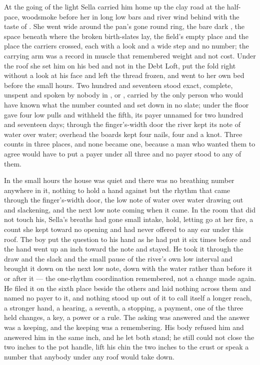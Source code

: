 \scenebreak

At the going of the light Sella carried him home up the clay road at the half-pace, woodsmoke before her in long low bars and river wind behind with the taste of . She went wide around the pan's gone round ring, the bare dark , the space beneath  where the broken birth-slates lay, the field's empty place and the place the carriers crossed, each with a look and a wide step and no number; the carrying arm was a record in muscle that remembered weight and not cost. Under the roof she set him on his bed and not in the Debt Loft, put the fold right without a look at his face and left the thread frozen, and went to her own bed before the small hours. Two hundred and seventeen stood exact, complete, unspent and spoken by nobody in ,  or , carried by the only person who would have known what the number counted and set down in no slate; under the floor  gave four low pulls and withheld the fifth, its payer unnamed for two hundred and seventeen days; through the finger's-width door the river kept its note of water over water; overhead the boards kept four nails, four and a knot. Three counts in three places, and none became one, because a man who wanted them to agree would have to put a payer under all three and no payer stood to any of them.

In the small hours the house was quiet and there was no breathing number anywhere in it, nothing to hold a hand against but the rhythm that came through the finger's-width door, the low note of water over water drawing out and slackening, and the next low note coming when it came. In the room that did not touch his, Sella's breaths had gone small intake, hold, letting go at her fire, a count she kept toward no opening and had never offered to any ear under this roof. The boy put the question to his hand as he had put it six times before and the hand went up an inch toward the note and stayed. He took it through the draw and the slack and the small pause of the river's own low interval and brought it down on the next low note, down with the water rather than before it or after it --- the one-rhythm coordination remembered, not a change made again. He filed it on the sixth place beside the others and laid nothing across them and named no payer to it, and nothing stood up out of it to call itself a longer reach, a stronger hand, a hearing, a seventh, a stopping, a payment, one of the three held changes, a key, a power or a rule. The asking was answered and the answer was a keeping, and the keeping was a remembering. His body refused him and answered him in the same inch, and he let both stand; he still could not close the two inches to the pot handle, lift his chin the two inches to the crust or speak a number that anybody under any roof would take down.

